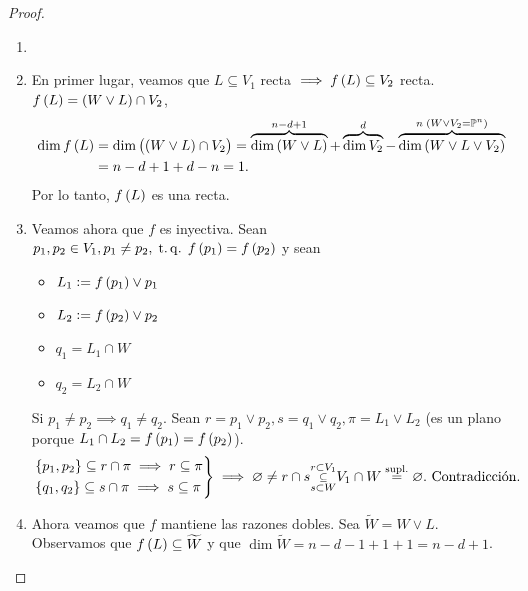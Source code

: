 \begin{proof}
    \begin{enumerate}[(1)]
        \item[]
        \item \label{item:col_teo2_it1} En primer lugar, veamos que $L \subseteq V_1$ recta $\implies f \lp L \rp \subseteq V_2$ recta. $f \lp L \rp = \lp W \vee L \rp \cap V_2$,
        \begin{align*}
            \dim f \lp L \rp &= \dim \lp \lp W \vee L \rp \cap V_2 \rp = \overbrace{\dim \lp W \vee L \rp}^{n-d+1} + \overbrace{\dim V_2}^d - \overbrace{\dim \lp W \vee L \vee V_2 \rp}^{n \; \lp W \vee V_2 = \Po^n \rp} \\
            &= n - d + 1 + d - n = 1.
        \end{align*}
        Por lo tanto, $f \lp L \rp$ es una recta.
        \item \label{item:col_teo2_it2} Veamos ahora que $f$ es inyectiva. Sean $p_1, p_2 \in V_1, p_1 \neq p_2, \tq f \lp p_1 \rp = f \lp p_2 \rp$ y sean
        \begin{itemize}
            \item $L_1 := f \lp p_1 \rp \vee p_1$
            \item $L_2 := f \lp p_2 \rp \vee p_2$
            \item $q_1 = L_1 \cap W$
            \item $q_2 = L_2 \cap W$
        \end{itemize}
        Si $p_1 \neq p_2 \implies q_1 \neq q_2$. Sean $r = p_1 \vee p_2, s = q_1 \vee q_2, \pi = L_1 \vee L_2$ (es un plano porque $L_1 \cap L_2 = f \lp p_1 \rp = f \lp p_2 \rp$).
        \begin{gather*}
            \begin{rcases}
                \{ p_1, p_2 \} \subseteq r \cap \pi \implies r \subseteq \pi \\
                \{ q_1, q_2 \} \subseteq s \cap \pi \implies s \subseteq \pi
            \end{rcases}
            \implies \emptyset \neq r \cap s \substack{r \subset V_1 \\ \subseteq \\ s \subset W} V_1 \cap W \stackrel{\text{supl.}}{=} \emptyset. \text{ Contradicción.}
        \end{gather*}
        \item \label{item:col_teo2_it3} Ahora veamos que $f$ mantiene las razones dobles. Sea $\widetilde{W} = W \vee L $. Observamos que $f \lp L \rp \subseteq \widetilde{W}$ y que $\dim \widetilde{W} = n-d-1+1+1= n-d+1$. \\

\end{enumerate}
\end{proof}
